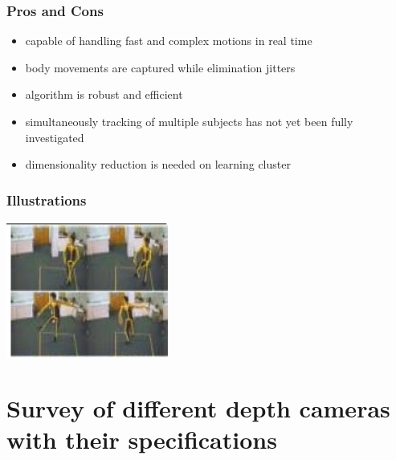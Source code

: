 \documentclass[a4paper,10pt]{report}
\begin{document}
\subsubsection{Pros and Cons}
\begin{itemize}
 \item capable of handling fast and complex motions in real time
 \item body movements are captured while elimination jitters
 \item algorithm is robust and efficient
 \item simultaneously tracking of multiple subjects has not yet been fully investigated
 \item dimensionality reduction is needed on learning cluster
\end{itemize}
\subsubsection{Illustrations}\newline\newline
\includegraphics{./skeltrack10.png}
\newline \newline


\section{Survey of different depth cameras with their specifications}
\end{document}
